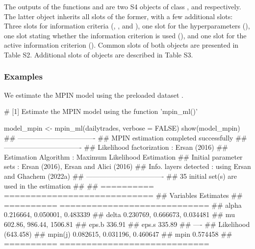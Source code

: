 The outputs of the functions  and  are two S4 objects of class , and  respectively. The latter object inherits all slots of the former, with a few additional slots: Three slots for information criteria (, , and ), one slot for the hyperparameters (), one slot stating whether the information criterion is used (), and one slot for the active information criterion (). Common slots of both objects are presented in Table S2. Additional slots of  objects are described in Table S3.

\subsubsection{Examples}

We estimate the MPIN model using the preloaded dataset .

\begin{example}
# [1] Estimate the MPIN model using the function 'mpin_ml()'

model_mpin <- mpin_ml(dailytrades, verbose = FALSE)
show(model_mpin)
## ----------------------------------
## MPIN estimation completed successfully
## ----------------------------------
## Likelihood factorization : Ersan (2016)
## Estimation Algorithm     : Maximum Likelihood Estimation
## Initial parameter sets   : Ersan (2016), Ersan and Alici (2016)
## Info. layers detected    : using Ersan and Ghachem (2022a)
## ----------------------------------
## 35 initial set(s) are used in the estimation 
## 
## ==========  ============================
## Variables   Estimates                   
## ==========  ============================
## alpha       0.216664, 0.050001, 0.483339
## delta       0.230769, 0.666673, 0.034481
## mu          602.86, 986.44, 1506.81     
## eps.b       336.91                      
## eps.s       335.89                      
## ----                                    
## Likelihood  (643.458)                   
## mpin(j)     0.082615, 0.031196, 0.460647
## mpin        0.574458                    
## ==========  ============================
\end{example}


